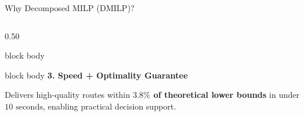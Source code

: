 \documentclass[aspectratio=169,10pt]{beamer}
\begin{document}
\begin{frame}{Why Decomposed MILP (DMILP)?}
\begin{columns}[T,totalwidth=\textwidth]
\begin{column}{0.50\textwidth}
\begin{beamercolorbox}[rounded=true,shadow=false,wd=\linewidth,sep=4pt]{block body}
        \end{beamercolorbox}

        \vspace{0.12cm}

        \begin{beamercolorbox}[rounded=true,shadow=false,wd=\linewidth,sep=4pt]{block body}
            {\bfseries\color{Primary}\scriptsize 3. Speed + Optimality Guarantee}\par\vspace{0.02cm}
            \scriptsize
            Delivers high-quality routes within \textbf{$3.8\%$ of theoretical lower bounds} in under \textbf{$10\text{ seconds}$}, enabling practical decision support.
        \end{beamercolorbox}
    \end{column}

\end{columns}

\vfill
\end{frame}

\end{document}
